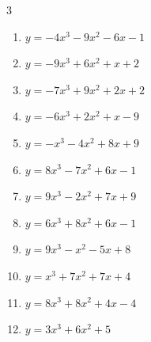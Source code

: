 \begin{multicols}{3}
\begin{enumerate}

  \item $y=-4x^{3}-9x^{2}-6x-1$


  \item $y=-9x^{3}+6x^{2}+x+2$


  \item $y=-7x^{3}+9x^{2}+2x+2$


  \item $y=-6x^{3}+2x^{2}+x-9$


  \item $y=-x^{3}-4x^{2}+8x+9$


  \item $y=8x^{3}-7x^{2}+6x-1$


  \item $y=9x^{3}-2x^{2}+7x+9$


  \item $y=6x^{3}+8x^{2}+6x-1$


  \item $y=9x^{3}-x^{2}-5x+8$


  \item $y=x^{3}+7x^{2}+7x+4$


  \item $y=8x^{3}+8x^{2}+4x-4$


  \item $y=3x^{3}+6x^{2}+5$



\end{enumerate}
\end{multicols}
